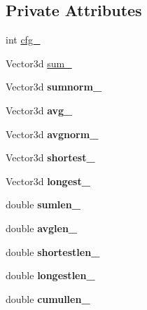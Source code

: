 \subsection*{Private Attributes}
\begin{CompactItemize}
\item 
int \hyperlink{class_vec_set_stats_c389362aaab290a37301168295c1bb07}{cfg\_\-}
\item 
Vector3d \hyperlink{class_vec_set_stats_6b267c33c513e2ca267d1e75e54828dd}{sum\_\-}
\item 
\hypertarget{class_vec_set_stats_43cfe7e1b1a01a7e46682782741f3ba8}{
Vector3d \textbf{sumnorm\_\-}}
\label{class_vec_set_stats_43cfe7e1b1a01a7e46682782741f3ba8}

\item 
\hypertarget{class_vec_set_stats_7dd2bb9237bb3d5319a7123f6c9bb5f7}{
Vector3d \textbf{avg\_\-}}
\label{class_vec_set_stats_7dd2bb9237bb3d5319a7123f6c9bb5f7}

\item 
\hypertarget{class_vec_set_stats_eecd2407a225f3adebe9c5c673c0dd9a}{
Vector3d \textbf{avgnorm\_\-}}
\label{class_vec_set_stats_eecd2407a225f3adebe9c5c673c0dd9a}

\item 
\hypertarget{class_vec_set_stats_eea888e9caf34a5a03049f2882fb098e}{
Vector3d \textbf{shortest\_\-}}
\label{class_vec_set_stats_eea888e9caf34a5a03049f2882fb098e}

\item 
\hypertarget{class_vec_set_stats_84e222df5cffb87fa471e100993469b3}{
Vector3d \textbf{longest\_\-}}
\label{class_vec_set_stats_84e222df5cffb87fa471e100993469b3}

\item 
\hypertarget{class_vec_set_stats_1bcb8977d966b38050bf48eee16ff6dd}{
double \textbf{sumlen\_\-}}
\label{class_vec_set_stats_1bcb8977d966b38050bf48eee16ff6dd}

\item 
\hypertarget{class_vec_set_stats_b660e97626286d70e381fe3df33b4220}{
double \textbf{avglen\_\-}}
\label{class_vec_set_stats_b660e97626286d70e381fe3df33b4220}

\item 
\hypertarget{class_vec_set_stats_5915bff1a81fa0ae62d8f3c1bc7dc213}{
double \textbf{shortestlen\_\-}}
\label{class_vec_set_stats_5915bff1a81fa0ae62d8f3c1bc7dc213}

\item 
\hypertarget{class_vec_set_stats_f802bcd03f9504792ca0d7d75b388015}{
double \textbf{longestlen\_\-}}
\label{class_vec_set_stats_f802bcd03f9504792ca0d7d75b388015}

\item 
\hypertarget{class_vec_set_stats_e54054f7d22ab2c2e8c7295bf8f1dc9b}{
double \textbf{cumullen\_\-}}
\label{class_vec_set_stats_e54054f7d22ab2c2e8c7295bf8f1dc9b}

\end{CompactItemize}


